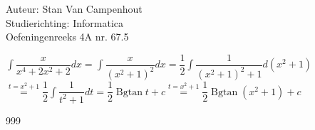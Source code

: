 \documentclass[a4paper]{article}
\begin{document}
  
\noindent \large Auteur: Stan Van Campenhout \\
\noindent \large Studierichting:  Informatica\\
\noindent \large Oefeningenreeks 4A nr. 67.5\\

\medskip

\normalsize

$ \displaystyle\int\dfrac{x}{x^4+2x^2+2}dx = \displaystyle\int\dfrac{x}{\left(x^2+1\right)^2}dx =\dfrac{1}{2}\displaystyle\int\dfrac{1}{\left(x^2+1\right)^2+1}d\left(x^2 + 1\right) $\\

$ \stackrel{t = x^2 + 1}{=} \dfrac{1}{2}\displaystyle\int\dfrac{1}{t^2+1}dt = \dfrac{1}{2}\operatorname{Bgtan}t + c
\stackrel{t = x^2 + 1}{=} \dfrac{1}{2}\operatorname{Bgtan}\left(x^2+1\right) + c $\\

\begin{thebibliography}{999}
\end{thebibliography}
\end{document}
